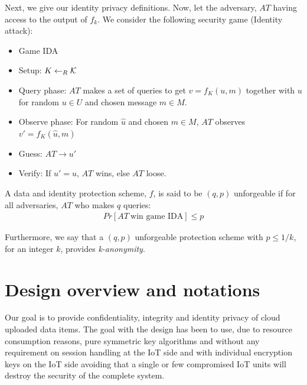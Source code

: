 {\begin{definition}
\end{definition}
Next, we give our identity privacy definitions. Now, let the adversary, $AT$ having access to the output of $f_{k}$. We consider the following security game (Identity attack):
\begin{itemize}
    \item[] Game IDA \\
    \item Setup: $K \leftarrow_R \cal{K}$
    \item Query phase: $AT$ makes a set of queries to get $v = f_K(u,m)$ together with $u$ for random $u \in U$ and chosen message $m \in M$.
    \item Observe phase: For random $\hat{u}$ and chosen $m \in M$, $AT$ observes  $v' = f_K(\hat{u},m)$
    \item Guess: $AT \rightarrow u'$
    \item Verify: If $u' =  \hat{u}$, $AT$ wins, else $AT$ loose.
\end{itemize}
\begin{definition}
\label{idprivacy}
A data and identity protection scheme, $f$, is said to be $(q,p)$ unforgeable if for all adversaries, $AT$ who makes $q$ queries: 
\begin{eqnarray}
     Pr[AT\: \text{win  game IDA}] \leq p \label{req:privacy}
\end{eqnarray}
\end{definition}
Furthermore, we say that a $(q,p)$ unforgeable protection scheme with $p \leq 1/k$, for an integer $k$, provides \textit{k-anonymity}. 

\graphicspath{{DesignOverview/images/}}
\section{Design overview and notations}
\label{design}
Our goal is to provide confidentiality, integrity and identity privacy of cloud uploaded data items. The goal with the design has been to use, due to resource consumption reasons, pure symmetric key algorithms and without any requirement on session handling at the IoT side and with individual encryption keys on the IoT side avoiding that a single or few compromised IoT units will destroy the security of the complete system.

}
